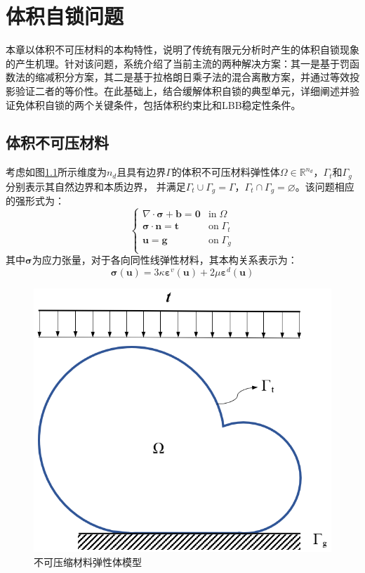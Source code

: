 \chapter{体积自锁问题}
本章以体积不可压材料的本构特性，说明了传统有限元分析时产生的体积自锁现象的产生机理。针对该问题，系统介绍了当前主流的两种解决方案：其一是基于罚函数法的缩减积分方案，其二是基于拉格朗日乘子法的混合离散方案，并通过等效投影验证二者的等价性。在此基础上，结合缓解体积自锁的典型单元，详细阐述并验证免体积自锁的两个关键条件，包括体积约束比和LBB稳定性条件。

\section{体积不可压材料}               
考虑如图\ref{model}所示维度为$n_d$且具有边界$\Gamma$的体积不可压材料弹性体$\Omega\in \mathbb R^{n_d}$，$\Gamma_t$和$\Gamma_g$分别表示其自然边界和本质边界，
并满足$\Gamma_t \cup \Gamma_g = \Gamma$，$\Gamma_t \cap \Gamma_g = \varnothing$。该问题相应的强形式为：
\begin{equation}\label{strong_penalty}
    \begin{cases}
        \nabla \cdot \boldsymbol \sigma + \boldsymbol b = \boldsymbol 0 & \mathrm{in} \; \Omega \\
        \boldsymbol \sigma \cdot \boldsymbol n = \boldsymbol t & \mathrm{on} \; \Gamma_t \\
        \boldsymbol u = \boldsymbol g & \mathrm{on} \; \Gamma_g \\
\end{cases}
\end{equation}
其中$\boldsymbol \sigma$为应力张量，对于各向同性线弹性材料，其本构关系表示为：
\begin{equation}\label{stress_penalty}
    \boldsymbol \sigma(\boldsymbol u) = 3\kappa \boldsymbol \varepsilon^v(\boldsymbol u) + 2\mu \boldsymbol \varepsilon^d(\boldsymbol u) 
\end{equation}
\begin{figure}[!h]
    \centering 
        \includegraphics[scale=0.6]{figures/model.png}
        \caption{不可压缩材料弹性体模型}\label{model}
\end{figure}
